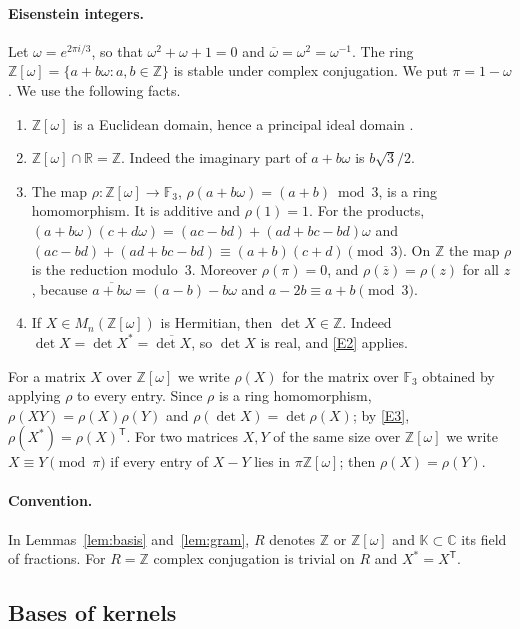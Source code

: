 \documentclass[11pt,a4paper]{article}
\theoremstyle{remark}
\newcommand{\ZZ}{\mathbb{Z}}
\newcommand{\RR}{\mathbb{R}}
\newcommand{\CC}{\mathbb{C}}
\newcommand{\FF}{\mathbb{F}}
\newcommand{\KK}{\mathbb{K}}
\newcommand{\tp}{\mathsf{T}}
\begin{document}
\paragraph{Eisenstein integers.} Let $\omega=e^{2\pi i/3}$, so that $\omega^2+\omega+1=0$ and
$\overline{\omega}=\omega^2=\omega^{-1}$. The ring $\ZZ[\omega]=\{a+b\omega : a,b\in\ZZ\}$ is stable under complex
conjugation. We put $\pi=1-\omega$. We use the following facts.
\begin{enumerate}[label=(E\arabic*),leftmargin=3em]
\item\label{E1} $\ZZ[\omega]$ is a Euclidean domain, hence a principal ideal domain \cite[Chapter~1, \S4]{IR}.
\item\label{E2} $\ZZ[\omega]\cap\RR=\ZZ$. Indeed the imaginary part of $a+b\omega$ is $b\sqrt3/2$.
\item\label{E3} The map $\rho:\ZZ[\omega]\to\FF_3$, $\rho(a+b\omega)=(a+b)\bmod 3$, is a ring homomorphism. It is
additive and $\rho(1)=1$. For the products,
$(a+b\omega)(c+d\omega)=(ac-bd)+(ad+bc-bd)\omega$ and $(ac-bd)+(ad+bc-bd)\equiv(a+b)(c+d)\pmod3$.
On $\ZZ$ the map $\rho$ is the reduction modulo~$3$. Moreover $\rho(\pi)=0$, and $\rho(\overline z)=\rho(z)$ for all
$z$, because $\overline{a+b\omega}=(a-b)-b\omega$ and $a-2b\equiv a+b\pmod 3$.
\item\label{E4} If $X\in M_n(\ZZ[\omega])$ is Hermitian, then $\det X\in\ZZ$. Indeed
$\det X=\det X^*=\overline{\det X}$, so $\det X$ is real, and \ref{E2} applies.
\end{enumerate}
For a matrix $X$ over $\ZZ[\omega]$ we write $\rho(X)$ for the matrix over $\FF_3$ obtained by applying $\rho$ to
every entry. Since $\rho$ is a ring homomorphism, $\rho(XY)=\rho(X)\rho(Y)$ and $\rho(\det X)=\det\rho(X)$; by
\ref{E3}, $\rho(X^*)=\rho(X)^{\tp}$. For two matrices $X,Y$ of the same size over $\ZZ[\omega]$ we write
$X\equiv Y\pmod\pi$ if every entry of $X-Y$ lies in $\pi\ZZ[\omega]$; then $\rho(X)=\rho(Y)$.

\paragraph{Convention.} In Lemmas~\ref{lem:basis} and~\ref{lem:gram}, $R$ denotes $\ZZ$ or $\ZZ[\omega]$ and
$\KK\subset\CC$ its field of fractions. For $R=\ZZ$ complex conjugation is trivial on $R$ and $X^*=X^{\tp}$.

\subsection{Bases of kernels}
\end{document}
